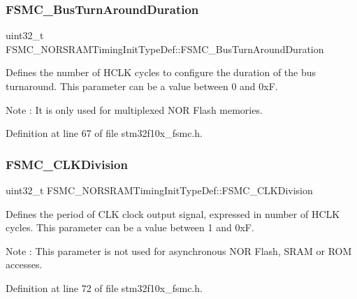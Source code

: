 \subsubsection{\texorpdfstring{F\+S\+M\+C\+\_\+\+Bus\+Turn\+Around\+Duration}{FSMC\_BusTurnAroundDuration}}
{\footnotesize\ttfamily uint32\+\_\+t F\+S\+M\+C\+\_\+\+N\+O\+R\+S\+R\+A\+M\+Timing\+Init\+Type\+Def\+::\+F\+S\+M\+C\+\_\+\+Bus\+Turn\+Around\+Duration}

Defines the number of H\+C\+LK cycles to configure the duration of the bus turnaround. This parameter can be a value between 0 and 0xF. \begin{DoxyNote}{Note}
\+: It is only used for multiplexed N\+OR Flash memories. 
\end{DoxyNote}


Definition at line 67 of file stm32f10x\+\_\+fsmc.\+h.

\mbox{\label{struct_f_s_m_c___n_o_r_s_r_a_m_timing_init_type_def_a251b439331b82eecea58aa3f8882ea15}} 
\subsubsection{\texorpdfstring{F\+S\+M\+C\+\_\+\+C\+L\+K\+Division}{FSMC\_CLKDivision}}
{\footnotesize\ttfamily uint32\+\_\+t F\+S\+M\+C\+\_\+\+N\+O\+R\+S\+R\+A\+M\+Timing\+Init\+Type\+Def\+::\+F\+S\+M\+C\+\_\+\+C\+L\+K\+Division}

Defines the period of C\+LK clock output signal, expressed in number of H\+C\+LK cycles. This parameter can be a value between 1 and 0xF. \begin{DoxyNote}{Note}
\+: This parameter is not used for asynchronous N\+OR Flash, S\+R\+AM or R\+OM accesses. 
\end{DoxyNote}


Definition at line 72 of file stm32f10x\+\_\+fsmc.\+h.

\mbox{\label{struct_f_s_m_c___n_o_r_s_r_a_m_timing_init_type_def_abc33886615fc3627448aa2dba11cfc77}} 
